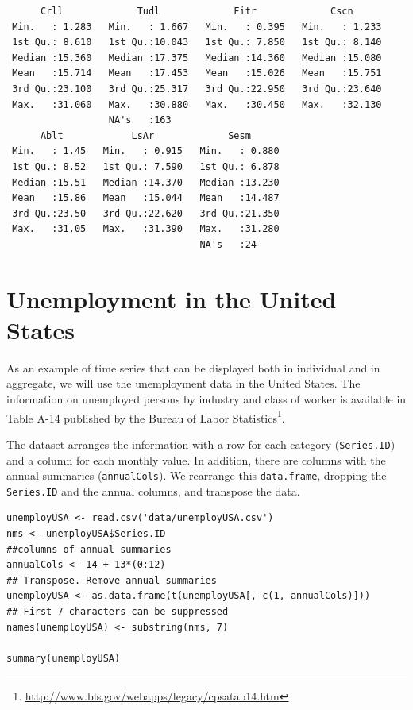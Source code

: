 \begin{verbatim}
      Crll             Tudl             Fitr             Cscn       
 Min.   : 1.283   Min.   : 1.667   Min.   : 0.395   Min.   : 1.233  
 1st Qu.: 8.610   1st Qu.:10.043   1st Qu.: 7.850   1st Qu.: 8.140  
 Median :15.360   Median :17.375   Median :14.360   Median :15.080  
 Mean   :15.714   Mean   :17.453   Mean   :15.026   Mean   :15.751  
 3rd Qu.:23.100   3rd Qu.:25.317   3rd Qu.:22.950   3rd Qu.:23.640  
 Max.   :31.060   Max.   :30.880   Max.   :30.450   Max.   :32.130  
                  NA's   :163                                       
      Ablt            LsAr             Sesm       
 Min.   : 1.45   Min.   : 0.915   Min.   : 0.880  
 1st Qu.: 8.52   1st Qu.: 7.590   1st Qu.: 6.878  
 Median :15.51   Median :14.370   Median :13.230  
 Mean   :15.86   Mean   :15.044   Mean   :14.487  
 3rd Qu.:23.50   3rd Qu.:22.620   3rd Qu.:21.350  
 Max.   :31.05   Max.   :31.390   Max.   :31.280  
                                  NA's   :24
\end{verbatim}

\section{Unemployment in the United States}
\label{sec:org56131cd}
As an example of time series that can be displayed both in individual
and in aggregate, we will use the unemployment data in the United
States. The information on unemployed persons by industry and class of
worker is available in Table A-14 published by the Bureau of Labor
Statistics\footnote{\url{http://www.bls.gov/webapps/legacy/cpsatab14.htm}}.

The dataset arranges the information with a row for each category
(\texttt{Series.ID}) and a column for each monthly value. In addition, there
are columns with the annual summaries (\texttt{annualCols}). We rearrange
this \texttt{data.frame}, dropping the \texttt{Series.ID} and the annual columns,
and transpose the data.


\lstset{language=r,label= ,caption= ,captionpos=b,numbers=none}
\begin{lstlisting}
unemployUSA <- read.csv('data/unemployUSA.csv')
nms <- unemployUSA$Series.ID
##columns of annual summaries
annualCols <- 14 + 13*(0:12)
## Transpose. Remove annual summaries
unemployUSA <- as.data.frame(t(unemployUSA[,-c(1, annualCols)]))
## First 7 characters can be suppressed
names(unemployUSA) <- substring(nms, 7)

summary(unemployUSA)
\end{lstlisting}

